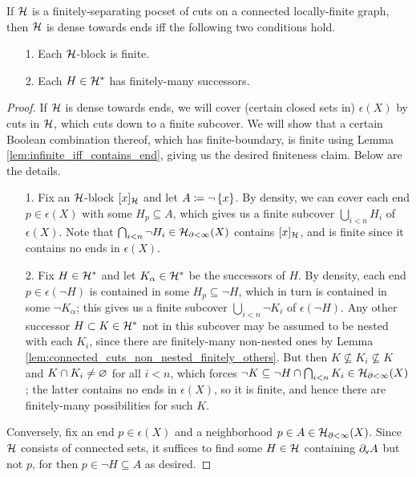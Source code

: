 \documentclass[reqno]{amsart}
\begin{document}
    \begin{proposition}\label{prp:dense_cuts_induces_proper_walling}
        If $\mc{H}$ is a finitely-separating pocset of cuts on a connected locally-finite graph, then $\mc{H}$ is dense towards ends iff the following two conditions hold.
        \begin{enumerate}
            \item[1.] Each $\mc{H}$-block is finite.
            \item[2.] Each $H\in\mc{H}^\ast$ has finitely-many successors.
        \end{enumerate}
    \end{proposition}
    \begin{proof}
        If $\mc{H}$ is dense towards ends, we will cover (certain closed sets in) $\epsilon(X)$ by cuts in $\mc{H}$, which cuts down to a finite subcover. We will show that a certain Boolean combination thereof, which has finite-boundary, is finite using Lemma \ref{lem:infinite_iff_contains_end}, giving us the desired finiteness claim. Below are the details.
        \begin{enumerate}
            \item[1.] Fix an $\mc{H}$-block $[x]_\mc{H}$ and let $A\coloneqq\lnot\l\{x\r\}$. By density, we can cover each end $p\in\epsilon(X)$ with some $H_p\subseteq A$, which gives us a finite subcover $\bigcup_{i<n}H_i$ of $\epsilon(X)$. Note that $\bigcap_{i<n}\lnot H_i\in\mc{H}_{\del<\infty}(X)$ contains $[x]_\mc{H}$, and is finite since it contains no ends in $\epsilon(X)$.
            \item[2.] Fix $H\in\mc{H}^\ast$ and let $K_\alpha\in\mc{H}^\ast$ be the successors of $H$. By density, each end $p\in\epsilon(\lnot H)$ is contained in some $H_p\subseteq\lnot H$, which in turn is contained in some $\lnot K_\alpha$; this gives us a finite subcover $\bigcup_{i<n}\lnot K_i$ of $\epsilon(\lnot H)$. Any other successor $H\subset K\in\mc{H}^\ast$ not in this subcover may be assumed to be nested with each $K_i$, since there are finitely-many non-nested ones by Lemma \ref{lem:connected_cuts_non_nested_finitely_others}. But then $K\not\subseteq K_i\not\subseteq K$ and $K\cap K_i\neq\em$ for all $i<n$, which forces $\lnot K\subseteq\lnot H\cap\bigcap_{i<n}K_i\in\mc{H}_{\del<\infty}(X)$; the latter contains no ends in $\epsilon(X)$, so it is finite, and hence there are finitely-many possibilities for such $K$.
        \end{enumerate}
        Conversely, fix an end $p\in\epsilon(X)$ and a neighborhood $p\in A\in\mc{H}_{\del<\infty}(X)$. Since $\mc{H}$ consists of connected sets, it suffices to find some $H\in\mc{H}$ containing $\del_\mathsf{v}A$ but not $p$, for then $p\in\lnot H\subseteq A$ as desired.

\end{proof}
\end{document}
